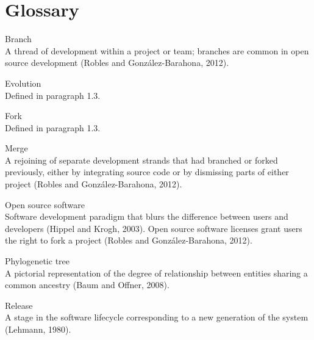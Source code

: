 \chapter{Glossary}

\begin{description}

\item{Branch} \hfill \\ A thread of development within a project or team; branches are common in open source development (Robles and González-Barahona, 2012).

\item{Evolution} \hfill \\ Defined in paragraph 1.3.

\item{Fork} \hfill \\ Defined in paragraph 1.3.

\item{Merge} \hfill \\ A rejoining of separate development strands that had branched or forked previously, either by integrating source code or by dismissing parts of either project (Robles and González-Barahona, 2012).

\item{Open source software} \hfill \\ Software development paradigm that blurs the difference between users and developers (Hippel and Krogh, 2003). Open source software licenses grant users the right to fork a project (Robles and González-Barahona, 2012).

\item{Phylogenetic tree} \hfill \\ A pictorial representation of the degree of relationship between entities sharing a common ancestry (Baum and Offner, 2008).

\item{Release} \hfill \\ A stage in the software lifecycle corresponding to a new generation of the system (Lehmann, 1980).

\end{description}

